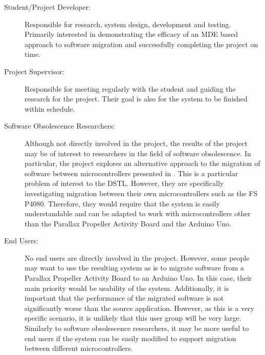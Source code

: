 \documentclass{UoYCSproject}
\begin{document}
\begin{description}
\item[Student/Project Developer:] Responsible for research, system design, development and testing. Primarily interested in demonstrating the efficacy of an MDE based approach to software migration and successfully completing the project on time.

\item[Project Supervisor:] Responsible for meeting regularly with the student and guiding the research for the project. Their goal is also for the system to be finished within schedule.

\item[Software Obsolescence Researchers:] Although not directly involved in the project, the results of the project may be of interest to researchers in the field of software obsolescence. In particular, the project explores an alternative approach to the migration of software between microcontrollers presented in \parencite{gerasimou2017technical}. This is a particular problem of interest to the DSTL. However, they are specifically investigating migration between their own microcontrollers such as the FS P4080. Therefore, they would require that the system is easily understandable and can be adapted to work with microcontrollers other than the Parallax Propeller Activity Board and the Arduino Uno.

\item[End Users:] No end users are directly involved in the project. However, some people may want to use the resulting system as is to migrate software from a Parallax Propeller Activity Board to an Arduino Uno. In this case, their main priority would be usability of the system. Additionally, it is important that the performance of the migrated software is not significantly worse than the source application. However, as this is a very specific scenario, it is unlikely that this user group will be very large. Similarly to software obsolescence researchers, it may be more useful to end users if the system can be easily modified to support migration between different microcontrollers.
\end{description}
\end{document}
